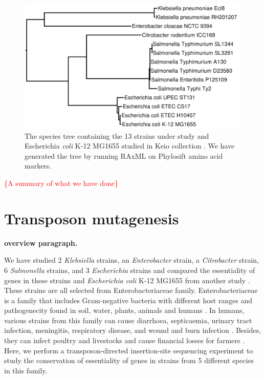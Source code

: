 \documentclass[12pt,letterpaper]{article}
\begin{document}
\begin{figure}
\includegraphics[scale=0.2]{phylosift-aa-raxmlbootstrap.pdf}
\caption{The species tree containing the 13 strains under study and Escherichia \textit{coli} K-12 MG1655 studied in Keio collection \cite{baba_construction_2006}. We have generated the tree by running RAxML \cite{stamatakis_raxml_2014} on Phylosift \cite{darling_phylosift:_2014} amino acid markers.}
\label{fig:species-tree}
\end{figure}

\textcolor{red}{\{A summary of what we have done\}}

\section{Transposon mutagenesis}

{\bf overview paragraph.}

We have studied 2 \textit{Klebsiella} strains, an \textit{Enterobacter} strain, a \textit{Citrobacter} strain, 6 \textit{Salmonella} strains, and 3 \textit{Escherichia} strains and compared the essentiality of genes in these strains and \textit{Escherichia coli} K-12 MG1655 from another study \cite{baba_construction_2006}. These strains are all selected from Enterobacteriaceae family. Enterobacteriaceae is a family that includes Gram-negative bacteria with different host ranges and pathogenecity found in soil, water, plants, animals and humans \cite{brenner_bergeys_2006}. In humans, various strains from this family can cause diarrhoea, septicaemia, urinary tract infection, meningitis, respiratory disease, and wound and burn infection \cite{brenner_bergeys_2006}. Besides, they can infect poultry and livestocks and cause financial losses for farmers \cite{brenner_bergeys_2006}. Here, we perform a transposon-directed insertion-site sequencing experiment to study the conservation of essentiality of genes in strains from 5 different species in this family.
\end{document}
